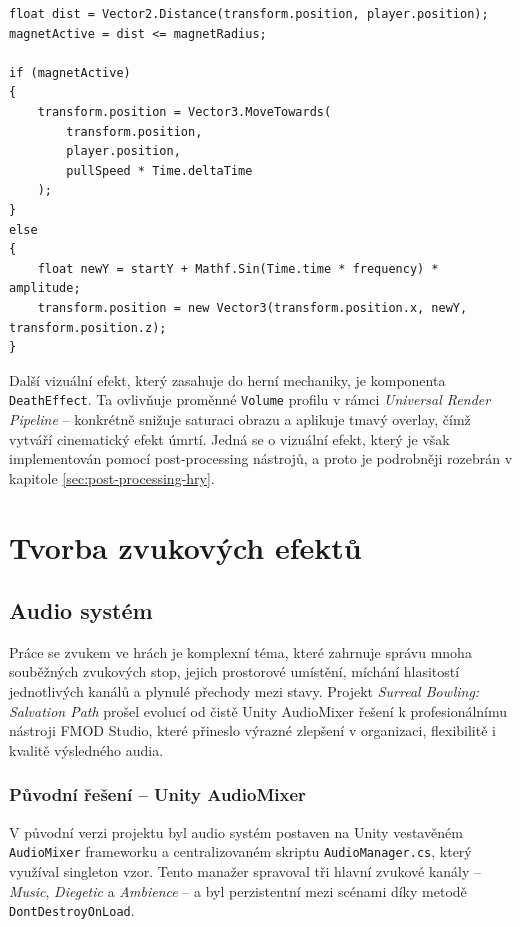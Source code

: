 \begin{lstlisting}[caption={OrbBehavior -- magnet a idle animace}, label={lst:orb-behavior}]
float dist = Vector2.Distance(transform.position, player.position);
magnetActive = dist <= magnetRadius;

if (magnetActive)
{
    transform.position = Vector3.MoveTowards(
        transform.position,
        player.position,
        pullSpeed * Time.deltaTime
    );
}
else
{
    float newY = startY + Mathf.Sin(Time.time * frequency) * amplitude;
    transform.position = new Vector3(transform.position.x, newY, transform.position.z);
}
\end{lstlisting}

Další vizuální efekt, který zasahuje do herní mechaniky, je komponenta \texttt{DeathEffect}.   Ta ovlivňuje proměnné \texttt{Volume} profilu v rámci \emph{Universal Render Pipeline} -- konkrétně snižuje saturaci obrazu a aplikuje tmavý overlay, čímž vytváří cinematický efekt úmrtí. Jedná se o vizuální efekt, který je však implementován pomocí post-processing nástrojů, a proto je podrobněji rozebrán v kapitole \ref{sec:post-processing-hry}.

\section{Tvorba zvukových efektů}
\label{sec:tvorba-zvukovych-efektu}

\subsection{Audio systém}
\label{sec:audio-system}

Práce se zvukem ve hrách je komplexní téma, které zahrnuje správu mnoha souběžných zvukových stop, jejich prostorové umístění, míchání hlasitostí jednotlivých kanálů a plynulé přechody mezi stavy. Projekt \emph{Surreal Bowling: Salvation Path} prošel evolucí od čistě Unity AudioMixer řešení k profesionálnímu nástroji FMOD Studio, které přineslo výrazné zlepšení v organizaci, flexibilitě i kvalitě výsledného audia.

\subsubsection{Původní řešení -- Unity AudioMixer}
\label{sec:puvodni-audiomixer}

V původní verzi projektu byl audio systém postaven na Unity vestavěném \texttt{AudioMixer} frameworku a centralizovaném skriptu \texttt{AudioManager.cs}, který využíval singleton vzor. Tento manažer spravoval tři hlavní zvukové kanály -- \emph{Music}, \emph{Diegetic} a \emph{Ambience} -- a byl perzistentní mezi scénami díky metodě \texttt{DontDestroyOnLoad}.

